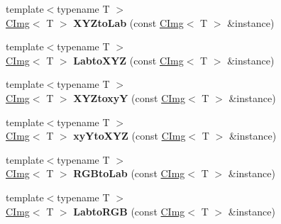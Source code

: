 \begin{DoxyCompactItemize}
\item 
\hypertarget{namespacecimg__library_a8243c773295471fa51e9daf51980ec08}{{\footnotesize template$<$typename T $>$ }\\\hyperlink{structcimg__library_1_1_c_img}{C\-Img}$<$ T $>$ {\bfseries X\-Y\-Zto\-Lab} (const \hyperlink{structcimg__library_1_1_c_img}{C\-Img}$<$ T $>$ \&instance)}\label{namespacecimg__library_a8243c773295471fa51e9daf51980ec08}

\item 
\hypertarget{namespacecimg__library_abb9670ff7e7d05cd52de64d06193834d}{{\footnotesize template$<$typename T $>$ }\\\hyperlink{structcimg__library_1_1_c_img}{C\-Img}$<$ T $>$ {\bfseries Labto\-X\-Y\-Z} (const \hyperlink{structcimg__library_1_1_c_img}{C\-Img}$<$ T $>$ \&instance)}\label{namespacecimg__library_abb9670ff7e7d05cd52de64d06193834d}

\item 
\hypertarget{namespacecimg__library_ab22f4c6070133a42fe07727fccf8f8c1}{{\footnotesize template$<$typename T $>$ }\\\hyperlink{structcimg__library_1_1_c_img}{C\-Img}$<$ T $>$ {\bfseries X\-Y\-Ztoxy\-Y} (const \hyperlink{structcimg__library_1_1_c_img}{C\-Img}$<$ T $>$ \&instance)}\label{namespacecimg__library_ab22f4c6070133a42fe07727fccf8f8c1}

\item 
\hypertarget{namespacecimg__library_a24cfe294f6732504e9dc856bc1c8fde0}{{\footnotesize template$<$typename T $>$ }\\\hyperlink{structcimg__library_1_1_c_img}{C\-Img}$<$ T $>$ {\bfseries xy\-Yto\-X\-Y\-Z} (const \hyperlink{structcimg__library_1_1_c_img}{C\-Img}$<$ T $>$ \&instance)}\label{namespacecimg__library_a24cfe294f6732504e9dc856bc1c8fde0}

\item 
\hypertarget{namespacecimg__library_a3e9d575396933415fe81cae41e41544a}{{\footnotesize template$<$typename T $>$ }\\\hyperlink{structcimg__library_1_1_c_img}{C\-Img}$<$ T $>$ {\bfseries R\-G\-Bto\-Lab} (const \hyperlink{structcimg__library_1_1_c_img}{C\-Img}$<$ T $>$ \&instance)}\label{namespacecimg__library_a3e9d575396933415fe81cae41e41544a}

\item 
\hypertarget{namespacecimg__library_aa1ba6f22ee11f6cba662a7a04508fca0}{{\footnotesize template$<$typename T $>$ }\\\hyperlink{structcimg__library_1_1_c_img}{C\-Img}$<$ T $>$ {\bfseries Labto\-R\-G\-B} (const \hyperlink{structcimg__library_1_1_c_img}{C\-Img}$<$ T $>$ \&instance)}\label{namespacecimg__library_aa1ba6f22ee11f6cba662a7a04508fca0}


\end{DoxyCompactItemize}
